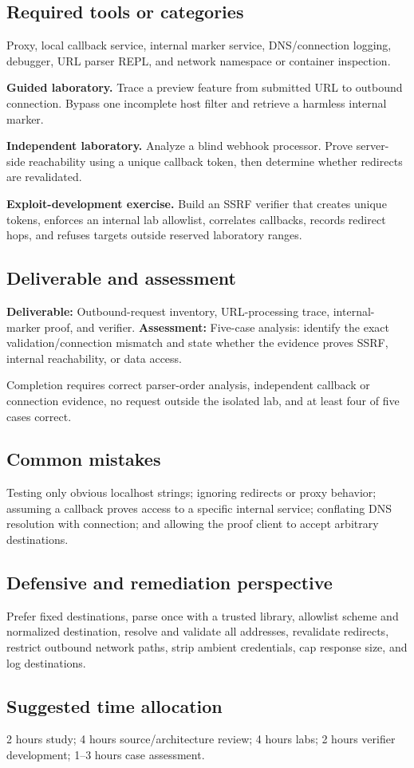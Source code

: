 \documentclass[11pt]{article}
\newcommand{\weekfield}[2]{%
  \Needspace{5\baselineskip}
  \subsection*{#1}
  #2
}
\newcommand{\deliverable}[1]{\textbf{Deliverable:} #1}
\newcommand{\assessment}[1]{\textbf{Assessment:} #1}
\begin{document}
\weekfield{Required tools or categories}{Proxy, local callback service, internal
marker service, DNS/connection logging, debugger, URL parser REPL, and network
namespace or container inspection.}

\begin{labbox}
\textbf{Guided laboratory.} Trace a preview feature from submitted URL to
outbound connection. Bypass one incomplete host filter and retrieve a harmless
internal marker.

\textbf{Independent laboratory.} Analyze a blind webhook processor. Prove server-
side reachability using a unique callback token, then determine whether redirects
are revalidated.

\textbf{Exploit-development exercise.} Build an SSRF verifier that creates unique
tokens, enforces an internal lab allowlist, correlates callbacks, records redirect
hops, and refuses targets outside reserved laboratory ranges.
\end{labbox}

\weekfield{Deliverable and assessment}{\deliverable{Outbound-request inventory,
URL-processing trace, internal-marker proof, and verifier.}
\assessment{Five-case analysis: identify the exact validation/connection mismatch
and state whether the evidence proves SSRF, internal reachability, or data access.}}

\begin{checkpoints}
Completion requires correct parser-order analysis, independent callback or
connection evidence, no request outside the isolated lab, and at least four of
five cases correct.
\end{checkpoints}

\weekfield{Common mistakes}{Testing only obvious localhost strings; ignoring
redirects or proxy behavior; assuming a callback proves access to a specific
internal service; conflating DNS resolution with connection; and allowing the
proof client to accept arbitrary destinations.}

\weekfield{Defensive and remediation perspective}{Prefer fixed destinations,
parse once with a trusted library, allowlist scheme and normalized destination,
resolve and validate all addresses, revalidate redirects, restrict outbound
network paths, strip ambient credentials, cap response size, and log destinations.}

\weekfield{Suggested time allocation}{2 hours study; 4 hours source/architecture
review; 4 hours labs; 2 hours verifier development; 1--3 hours case assessment.}
\end{document}
